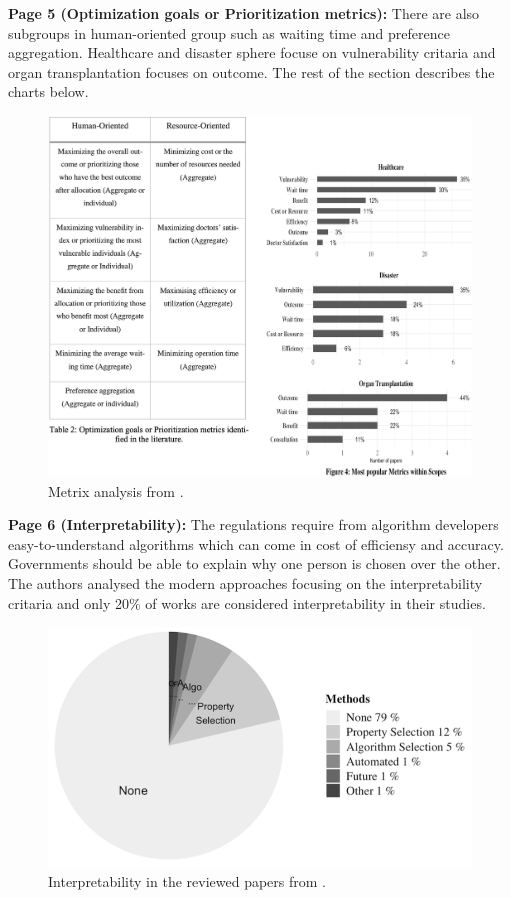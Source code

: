     \textbf{Page 5 (Optimization goals or Prioritization metrics):}
    There are also subgroups in human-oriented group such as waiting time and preference aggregation. Healthcare and disaster sphere focuse on vulnerability critaria and organ transplantation focuses on outcome. The rest of the section describes the charts below. 
    \begin{figure}[H]
        \centering
        \includegraphics[width=1\textwidth]{figures/AR0017GB23/fig4.png}
        \caption{Metrix analysis from \cite{x121}.}
        \label{fig4:AR0017GB23}
    \end{figure}
    
    \textbf{Page 6 (Interpretability):}
    The regulations require from algorithm developers easy-to-understand algorithms which can come in cost of efficiensy and accuracy. Governments should be able to explain why one person is chosen over the other. The authors analysed the modern approaches focusing on the interpretability critaria and only 20\% of works are considered interpretability in their studies.
    \begin{figure}[H]
        \centering
        \includegraphics[width=.7\textwidth]{figures/AR0017GB23/fig5.png}
        \caption{Interpretability in the reviewed papers from \cite{x121}.}
        \label{fig5:AR0017GB23}
    \end{figure} 
    
